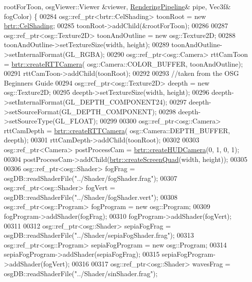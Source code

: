 \begin{DoxyCode}
       rootForToon, osgViewer::Viewer &viewer, \hyperlink{structbrtr_1_1_rendering_pipeline}{RenderingPipeline}& pipe, Vec3f& fogColor) \{
00284         osg::ref\_ptr<brtr::CelShading> toonRoot = \textcolor{keyword}{new} \hyperlink{classbrtr_1_1_cel_shading}{brtr::CelShading};
00285         toonRoot->addChild(&rootForToon);
00286 
00287         osg::ref\_ptr<osg::Texture2D> toonAndOutline = \textcolor{keyword}{new} osg::Texture2D;
00288         toonAndOutline->setTextureSize(width, height);
00289         toonAndOutline->setInternalFormat(GL\_RGBA);
00290         osg::ref\_ptr<osg::Camera> rttCamToon = \hyperlink{namespacebrtr_aa7a89c381be095a7eb1e248d2e6c0e23}{brtr::createRTTCamera}(
      osg::Camera::COLOR\_BUFFER, toonAndOutline);
00291         rttCamToon->addChild(toonRoot);
00292 
00293         \textcolor{comment}{//taken from the OSG Beginners Guide}
00294         osg::ref\_ptr<osg::Texture2D> deepth = \textcolor{keyword}{new} osg::Texture2D;
00295         deepth->setTextureSize(width, height);
00296         deepth->setInternalFormat(GL\_DEPTH\_COMPONENT24);
00297         deepth->setSourceFormat(GL\_DEPTH\_COMPONENT);
00298         deepth->setSourceType(GL\_FLOAT);
00299 
00300         osg::ref\_ptr<osg::Camera> rttCamDepth = \hyperlink{namespacebrtr_aa7a89c381be095a7eb1e248d2e6c0e23}{brtr::createRTTCamera}(
      osg::Camera::DEPTH\_BUFFER, deepth);
00301         rttCamDepth->addChild(toonRoot);
00302 
00303         osg::ref\_ptr<Camera> postProcessCam = \hyperlink{namespacebrtr_a62da4f109238c45882dd64d7a7e97a1d}{brtr::createHUDCamera}(0, 1, 0, 1);
00304         postProcessCam->addChild(\hyperlink{namespacebrtr_a32cfc96621681baabc76c52af5d6a347}{brtr::createScreenQuad}(width, height));
00305 
00306         osg::ref\_ptr<osg::Shader> fogFrag = osgDB::readShaderFile(\textcolor{stringliteral}{"../Shader/fogShader.frag"});
00307         osg::ref\_ptr<osg::Shader> fogVert = osgDB::readShaderFile(\textcolor{stringliteral}{"../Shader/fogShader.vert"});
00308         osg::ref\_ptr<osg::Program> fogProgram = \textcolor{keyword}{new} osg::Program;
00309         fogProgram->addShader(fogFrag);
00310         fogProgram->addShader(fogVert);
00311 
00312         osg::ref\_ptr<osg::Shader> sepiaFogFrag = osgDB::readShaderFile(\textcolor{stringliteral}{"../Shader/sepiaFogShader.frag"});
00313         osg::ref\_ptr<osg::Program> sepiaFogProgram = \textcolor{keyword}{new} osg::Program;
00314         sepiaFogProgram->addShader(sepiaFogFrag);
00315         sepiaFogProgram->addShader(fogVert);
00316 
00317         osg::ref\_ptr<osg::Shader> wavesFrag = osgDB::readShaderFile(\textcolor{stringliteral}{"../Shader/sinShader.frag"});

\end{DoxyCode}
